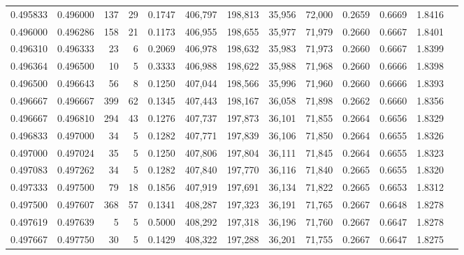 \begin{tabular}{rrrrrrrrrrrrr}
0.495833 & 0.496000 &   137 &  29 &                                     0.1747 & 406,797 & 198,813 &  35,956 &  72,000 & 0.2659 & 0.6669 & 1.8416 \\
0.496000 & 0.496286 &   158 &  21 &                                     0.1173 & 406,955 & 198,655 &  35,977 &  71,979 & 0.2660 & 0.6667 & 1.8401 \\
0.496310 & 0.496333 &    23 &   6 &                                     0.2069 & 406,978 & 198,632 &  35,983 &  71,973 & 0.2660 & 0.6667 & 1.8399 \\
0.496364 & 0.496500 &    10 &   5 &                                     0.3333 & 406,988 & 198,622 &  35,988 &  71,968 & 0.2660 & 0.6666 & 1.8398 \\
0.496500 & 0.496643 &    56 &   8 &                                     0.1250 & 407,044 & 198,566 &  35,996 &  71,960 & 0.2660 & 0.6666 & 1.8393 \\
0.496667 & 0.496667 &   399 &  62 &                                     0.1345 & 407,443 & 198,167 &  36,058 &  71,898 & 0.2662 & 0.6660 & 1.8356 \\
0.496667 & 0.496810 &   294 &  43 &                                     0.1276 & 407,737 & 197,873 &  36,101 &  71,855 & 0.2664 & 0.6656 & 1.8329 \\
0.496833 & 0.497000 &    34 &   5 &                                     0.1282 & 407,771 & 197,839 &  36,106 &  71,850 & 0.2664 & 0.6655 & 1.8326 \\
0.497000 & 0.497024 &    35 &   5 &                                     0.1250 & 407,806 & 197,804 &  36,111 &  71,845 & 0.2664 & 0.6655 & 1.8323 \\
0.497083 & 0.497262 &    34 &   5 &                                     0.1282 & 407,840 & 197,770 &  36,116 &  71,840 & 0.2665 & 0.6655 & 1.8320 \\
0.497333 & 0.497500 &    79 &  18 &                                     0.1856 & 407,919 & 197,691 &  36,134 &  71,822 & 0.2665 & 0.6653 & 1.8312 \\
0.497500 & 0.497607 &   368 &  57 &                                     0.1341 & 408,287 & 197,323 &  36,191 &  71,765 & 0.2667 & 0.6648 & 1.8278 \\
0.497619 & 0.497639 &     5 &   5 &                                     0.5000 & 408,292 & 197,318 &  36,196 &  71,760 & 0.2667 & 0.6647 & 1.8278 \\
0.497667 & 0.497750 &    30 &   5 &                                     0.1429 & 408,322 & 197,288 &  36,201 &  71,755 & 0.2667 & 0.6647 & 1.8275 \\

\end{tabular}
